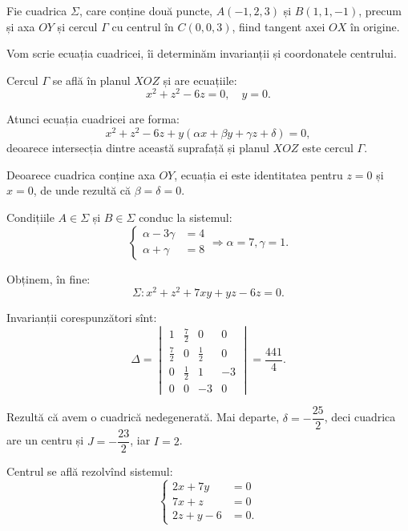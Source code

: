 \begin{example}
	Fie cuadrica $\Sigma$, care conține două puncte, $A(-1, 2, 3)$ și
$B(1, 1, -1)$, precum și axa $OY$ și cercul $\Gamma$ cu centrul în 
$C(0, 0, 3)$, fiind tangent axei $OX$ în origine.

Vom scrie ecuația cuadricei, îi determinăm invarianții și coordonatele 
centrului.

Cercul $\Gamma$ se află în planul $XOZ$ și are ecuațiile: 
 \[
	x^2 + z^2 - 6z = 0, \quad y = 0.
\]

Atunci ecuația cuadricei are forma: 
 \[
	x^2 + z^2 - 6z + y(\alpha x + \beta y + \gamma z + \delta) = 0,
\]
deoarece intersecția dintre această suprafață și planul $XOZ$ este cercul
$\Gamma$.

Deoarece cuadrica conține axa $OY$, ecuația ei este identitatea pentru $z = 0$
și $x = 0$, de unde rezultă că $\beta = \delta = 0$.

Condițiile $A \in \Sigma$ și $B \in \Sigma$ conduc la sistemul: 
 \[
	\begin{cases}	
	    \alpha - 3 \gamma &= 4 \\
	    \alpha + \gamma &= 8
    \end{cases} \Longrightarrow \alpha = 7, \gamma = 1.
\]

Obținem, în fine: 
 \[
	\Sigma : x^2 + z^2 + 7xy + yz - 6z = 0.
\]

Invarianții corespunzători sînt: 
 \[
	\Delta = \begin{vmatrix}
	             1 & \frac{7}{2} & 0 & 0 \\
	             \frac{7}{2} & 0 & \frac{1}{2} & 0 \\
	             0 & \frac{1}{2} & 1 & -3 \\
	             0 & 0 & -3 & 0
             \end{vmatrix} = \dfrac{441}{4}.
\]

Rezultă că avem o cuadrică nedegenerată. Mai departe, $\delta = -\dfrac{25}{2}$,
deci cuadrica are un centru și $J = - \dfrac{23}{2}$, iar $I = 2$.

Centrul se află rezolvînd sistemul: 
 \[
	\begin{cases}	
	    2x + 7y &= 0 \\
	    7x + z &= 0 \\
	    2z + y - 6 &= 0.
    \end{cases}
\]
\end{example}


